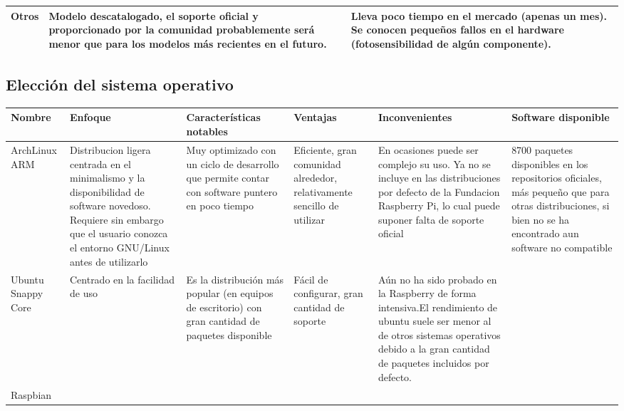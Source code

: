 \begin{landscape}
\begin{table}[h]
\begin{tabular}{|p{3cm}|p{6cm}|p{6cm}|p{6cm}|}
Otros & Modelo descatalogado, el soporte oficial y proporcionado por la comunidad probablemente será menor que para los modelos más recientes en el futuro. &  & Lleva poco tiempo en el mercado (apenas un mes). Se conocen pequeños fallos en el hardware (fotosensibilidad de algún componente).\\ \hline

\end{tabular}
\end{table}
\end{landscape}



\begin{landscape}
\subsection{Elección del sistema operativo}

\begin{table}[h]
\begin{tabular}{|p{2cm}|p{4cm}|p{5cm}|p{3cm}|p{4cm}|p{4cm}|}
\hline
Nombre & Enfoque & Características notables & Ventajas & Inconvenientes & Software disponible\\ \hline
ArchLinux ARM & Distribucion ligera centrada en el minimalismo y la disponibilidad de software novedoso. Requiere sin embargo que el usuario conozca el entorno GNU/Linux antes de utilizarlo & Muy optimizado con un ciclo de desarrollo que permite contar con software puntero en poco tiempo & Eficiente, gran comunidad alrededor, relativamente sencillo de utilizar & En ocasiones puede ser complejo su uso. Ya no se incluye en las distribuciones por defecto de la Fundacion Raspberry Pi, lo cual puede suponer falta de soporte oficial & 8700 paquetes disponibles en los repositorios oficiales, más pequeño que para otras distribuciones, si bien no se ha encontrado aun software no compatible\\ \hline

Ubuntu Snappy Core & Centrado en la facilidad de uso & Es la distribución más popular (en equipos de escritorio) con gran cantidad de paquetes disponible & Fácil de configurar, gran cantidad de soporte & Aún no ha sido probado en la Raspberry de forma intensiva.El rendimiento de ubuntu suele ser menor al de otros sistemas operativos debido a la gran cantidad de paquetes incluidos por defecto. & \\ \hline 

Raspbian & & & & &\\ \hline
\end{tabular}
\end{table}
\end{landscape}

